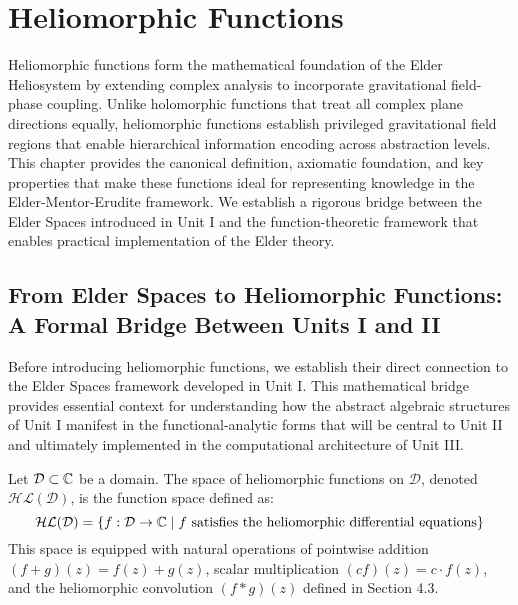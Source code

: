 \chapter{Heliomorphic Functions}

\begin{chapterabstract}
Heliomorphic functions form the mathematical foundation of the Elder Heliosystem by extending complex analysis to incorporate gravitational field-phase coupling. Unlike holomorphic functions that treat all complex plane directions equally, heliomorphic functions establish privileged gravitational field regions that enable hierarchical information encoding across abstraction levels. This chapter provides the canonical definition, axiomatic foundation, and key properties that make these functions ideal for representing knowledge in the Elder-Mentor-Erudite framework. We establish a rigorous bridge between the Elder Spaces introduced in Unit I and the function-theoretic framework that enables practical implementation of the Elder theory.
\end{chapterabstract}

\section{From Elder Spaces to Heliomorphic Functions: A Formal Bridge Between Units I and II}

Before introducing heliomorphic functions, we establish their direct connection to the Elder Spaces framework developed in Unit I. This mathematical bridge provides essential context for understanding how the abstract algebraic structures of Unit I manifest in the functional-analytic forms that will be central to Unit II and ultimately implemented in the computational architecture of Unit III.

\begin{definition}
Let $\mathcal{D} \subset \mathbb{C}$ be a domain. The space of heliomorphic functions on $\mathcal{D}$, denoted $\mathcal{HL}(\mathcal{D})$, is the function space defined as:
\begin{equation}
\mathcal{HL}(\mathcal{D}) = \left\{ f: \mathcal{D} \rightarrow \mathbb{C} \; \middle| \; f \text{ satisfies the heliomorphic differential equations} \right\}
\end{equation}
This space is equipped with natural operations of pointwise addition $(f+g)(z) = f(z) + g(z)$, scalar multiplication $(cf)(z) = c \cdot f(z)$, and the heliomorphic convolution $(f * g)(z)$ defined in Section 4.3.
\end{definition}

